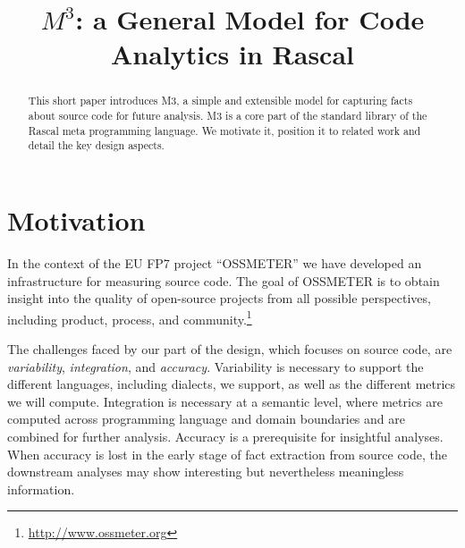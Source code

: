 \documentclass[conference]{IEEEtran}
\begin{document}
\title{$M^3$: a General Model for Code Analytics in Rascal}

\author{
}

\maketitle

\begin{abstract}
This short paper introduces M3, a simple and extensible model for capturing facts about source code for future analysis. M3 is a core part of the standard library of the Rascal meta programming language. We motivate it, position it to related work and detail the key design aspects.
\end{abstract}

\section{Motivation}

In the context of the EU FP7 project ``OSSMETER'' we have developed an
infrastructure for measuring source code. The goal of OSSMETER is to obtain
insight into the quality of open-source projects from all possible perspectives,
including product, process, and
community.\!\footnote{\url{http://www.ossmeter.org}}

The challenges faced by our part of the design, which focuses on source code,
are \emph{variability}, \emph{integration}, and \emph{accuracy}. Variability is
necessary to support the different languages, including dialects, we support,
as well as the different metrics we will compute. Integration is necessary at
a semantic level, where metrics are computed across programming language and
domain boundaries and are combined for further analysis. Accuracy is a
prerequisite for insightful analyses. When accuracy is lost in the early stage
of fact extraction from source code, the downstream analyses may show
interesting but nevertheless meaningless information.
\end{document}
